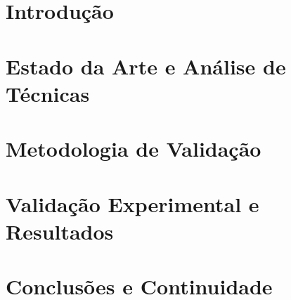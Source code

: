 \documentclass[12pt,Final,Portugues]{tese-FT}
\begin{document}
\newpage
\tableofcontents

\newpage
\listoffigures

\newpage
\listoftables

\newpage
\printnomenclature


\newpage

\chapter{Introdução}


\chapter{Estado da Arte e Análise de Técnicas}


\chapter{Metodologia de Validação}


\chapter{Validação Experimental e Resultados}


\chapter{Conclusões e Continuidade}


\printbibliography[title=Referências Bibliográficas]

\appendix

\end{document}
